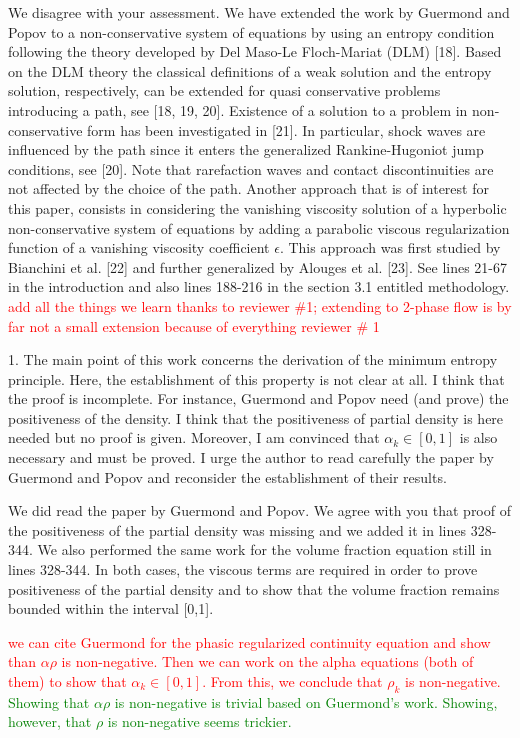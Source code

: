 \documentclass{article}
\newcommand{\tcr}[1]{\textcolor{red}{#1}}
\newcommand{\tcg}[1]{\textcolor{green}{#1}}
\begin{document}
We disagree with your assessment. We have extended the work by Guermond and Popov to a non-conservative system of equations
by using an entropy condition following the theory developed by Del Maso-Le Floch-Mariat (DLM) [18]. 
Based on the DLM theory the classical definitions of a weak solution and the entropy solution, respectively, can be extended for quasi conservative problems introducing a path, see [18, 19, 20]. Existence of a solution to a problem in non-conservative form has been investigated in [21]. In particular, shock waves are influenced by the path since it enters the generalized Rankine-Hugoniot jump conditions, see [20]. Note that rarefaction waves and contact discontinuities are not affected by the choice of the path. Another approach that is of interest for this paper, consists in considering the
vanishing viscosity solution of a hyperbolic non-conservative system of equations by adding a parabolic viscous regularization function of a vanishing viscosity coefficient $\epsilon$. This approach was first studied by Bianchini et al. [22] and further generalized by Alouges et al. [23].
See lines 21-67 in the introduction and also lines 188-216 in the section 3.1 entitled methodology.
\tcr{add all the things we learn thanks to reviewer \#1; 
extending to 2-phase flow is by far not a small extension because of everything
reviewer \# 1}
\bigskip




{\color{blue}
1. The main point of this work concerns the derivation of the minimum
entropy principle. Here, the establishment of this property is not clear
at all. I think that the proof is incomplete. For instance, Guermond
and Popov need (and prove) the positiveness of the density. I think that
the positiveness of partial density is here needed but no proof is given.
Moreover, I am convinced that $\alpha_k \in [0, 1]$ is also necessary and must be
proved. I urge the author to read carefully the paper by Guermond and
Popov and reconsider the establishment of their results.}

We did read the paper by Guermond and Popov. We agree with you that proof of the positiveness of the partial density was missing and we added it in lines 328-344.
We also performed the same work for the volume fraction equation still in lines 328-344. In both cases, the viscous terms are required in order to prove positiveness of the
partial density and to show that the volume fraction remains bounded within the interval [0,1].

\tcr{we can cite Guermond for the phasic regularized continuity equation and show
than $\alpha \rho$ is non-negative. Then we can work on the alpha equations (both of them) to show
that  $\alpha_k \in [0, 1]$. From this, we conclude that $\rho_k$ is non-negative.} \tcg{Showing that $\alpha \rho$ is
non-negative is trivial based on Guermond's work. Showing, however, that $\rho$ is non-negative seems trickier.}
\bigskip
\end{document}
